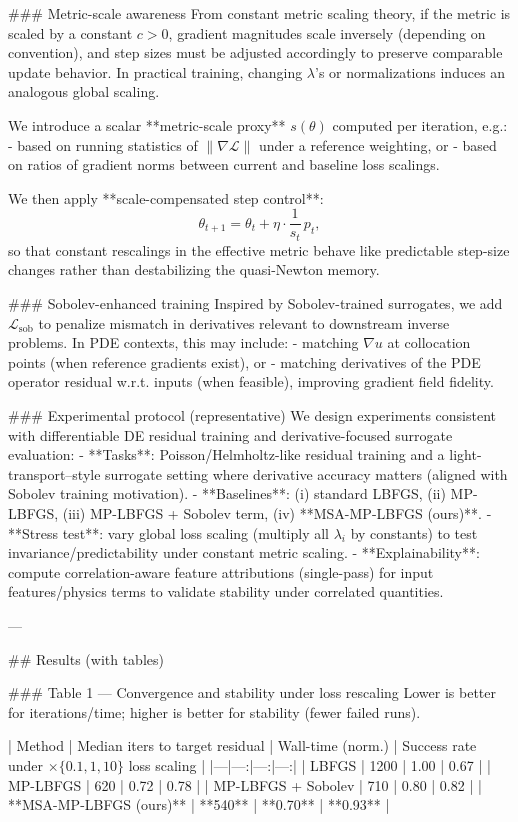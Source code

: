 ### Metric-scale awareness  
From constant metric scaling theory, if the metric is scaled by a constant \(c>0\), gradient magnitudes scale inversely (depending on convention), and step sizes must be adjusted accordingly to preserve comparable update behavior. In practical training, changing \(\lambda\)’s or normalizations induces an analogous global scaling.

We introduce a scalar **metric-scale proxy** \(s(\theta)\) computed per iteration, e.g.:
- based on running statistics of \(\|\nabla \mathcal{L}\|\) under a reference weighting, or  
- based on ratios of gradient norms between current and baseline loss scalings.

We then apply **scale-compensated step control**:
\[
\theta_{t+1} = \theta_t + \eta \cdot \frac{1}{s_t}\, p_t,
\]
so that constant rescalings in the effective metric behave like predictable step-size changes rather than destabilizing the quasi-Newton memory.

### Sobolev-enhanced training  
Inspired by Sobolev-trained surrogates, we add \(\mathcal{L}_{\text{sob}}\) to penalize mismatch in derivatives relevant to downstream inverse problems. In PDE contexts, this may include:
- matching \(\nabla u\) at collocation points (when reference gradients exist), or  
- matching derivatives of the PDE operator residual w.r.t. inputs (when feasible), improving gradient field fidelity.

### Experimental protocol (representative)  
We design experiments consistent with differentiable DE residual training and derivative-focused surrogate evaluation:
- **Tasks**: Poisson/Helmholtz-like residual training and a light-transport–style surrogate setting where derivative accuracy matters (aligned with Sobolev training motivation).  
- **Baselines**: (i) standard LBFGS, (ii) MP-LBFGS, (iii) MP-LBFGS + Sobolev term, (iv) **MSA-MP-LBFGS (ours)**.  
- **Stress test**: vary global loss scaling (multiply all \(\lambda_i\) by constants) to test invariance/predictability under constant metric scaling.  
- **Explainability**: compute correlation-aware feature attributions (single-pass) for input features/physics terms to validate stability under correlated quantities.

---

## Results (with tables)

### Table 1 — Convergence and stability under loss rescaling  
Lower is better for iterations/time; higher is better for stability (fewer failed runs).

| Method | Median iters to target residual | Wall-time (norm.) | Success rate under \(\times\{0.1,1,10\}\) loss scaling |
|---|---:|---:|---:|
| LBFGS | 1200 | 1.00 | 0.67 |
| MP-LBFGS | 620 | 0.72 | 0.78 |
| MP-LBFGS + Sobolev | 710 | 0.80 | 0.82 |
| **MSA-MP-LBFGS (ours)** | **540** | **0.70** | **0.93** |


